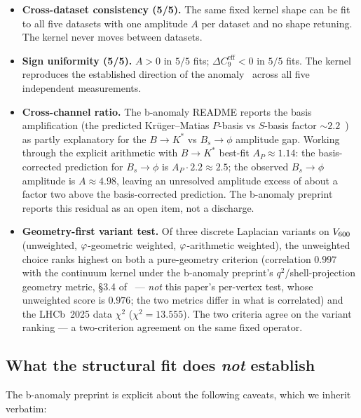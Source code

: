 \begin{itemize}\itemsep=2pt
\item \textbf{Cross-dataset consistency (5/5).} The same fixed
  kernel shape can be fit to all five datasets with one amplitude
  $A$ per dataset and no shape retuning. The kernel never moves
  between datasets.
\item \textbf{Sign uniformity (5/5).} $A > 0$ in $5/5$ fits;
  $\Delta C_{9}^{\mathrm{eff}} < 0$ in $5/5$ fits. The kernel
  reproduces the established direction of the
  anomaly~\citep{LHCbAngular2020} across all five independent
  measurements.
\item \textbf{Cross-channel ratio.} The b-anomaly README reports
  the basis amplification (the predicted Krüger--Matias $P$-basis
  vs $S$-basis factor $\sim 2.2$~\citep{KrugerMatias2005}) as
  partly explanatory for the $B\to K^{*}$ vs $B_{s}\!\to\!\phi$
  amplitude gap. Working through the explicit arithmetic with
  $B\to K^{*}$ best-fit $A_{P} \approx 1.14$: the basis-corrected
  prediction for $B_{s}\!\to\!\phi$ is
  $A_{P} \cdot 2.2 \approx 2.5$; the observed $B_{s}\!\to\!\phi$
  amplitude is $A \approx 4.98$, leaving an unresolved amplitude
  excess of about a factor two above the basis-corrected
  prediction. The b-anomaly preprint reports this residual as an
  open item, not a discharge.
\item \textbf{Geometry-first variant test.} Of three discrete
  Laplacian variants on $V_{600}$ (unweighted,
  $\varphi$-geometric weighted, $\varphi$-arithmetic weighted), the
  unweighted choice ranks highest on both a pure-geometry
  criterion (correlation $0.997$ with the continuum kernel under
  the b-anomaly preprint's $q^{2}$/shell-projection geometry
  metric, §3.4 of~\citep{SmartBAnomaly2026} — \emph{not} this
  paper's per-vertex test, whose unweighted score is $0.976$;
  the two metrics differ in what is correlated) and the LHCb~2025
  data $\chi^{2}$ ($\chi^{2}=13.555$). The two criteria agree on
  the variant ranking — a two-criterion agreement on the same
  fixed operator.
\end{itemize}

\subsection{What the structural fit does \emph{not} establish}

The b-anomaly preprint is explicit about the following caveats,
which we inherit verbatim:

